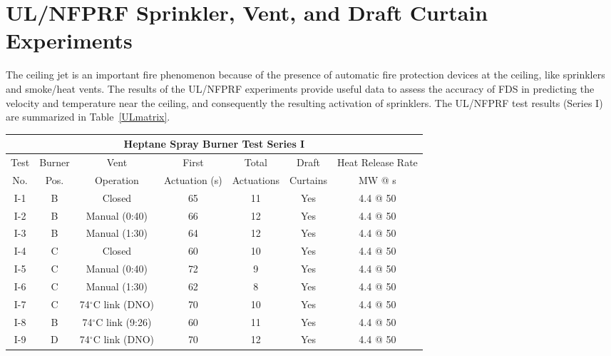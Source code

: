 \clearpage

\section{UL/NFPRF Sprinkler, Vent, and Draft Curtain Experiments}
\label{UL_NFPRF:Results}

The ceiling jet is an important fire phenomenon because of the presence of automatic fire protection devices at the ceiling, like
sprinklers and smoke/heat vents. The results of the UL/NFPRF experiments provide useful data to assess the accuracy of FDS in predicting
the velocity and temperature near the ceiling, and consequently the resulting activation of sprinklers.
The UL/NFPRF test results (Series I) are summarized in Table~\ref{ULmatrix}.

\begin{table}[h!]
\begin{center}
\begin{tabular}{|c||c|c|c|c|c|c|}
\hline
\multicolumn{7}{|c|}{\bf Heptane Spray Burner Test Series I}  \\ \hline \hline
Test & Burner & Vent                    & First         & Total      & Draft    & Heat Release Rate \\
No.  & Pos.   & Operation               & Actuation (s) & Actuations & Curtains & MW @ s \\
\hline \hline
I-1   & B  & Closed                     & 65            & 11        & Yes  & 4.4 @ 50  \\ \hline
I-2   & B  & Manual (0:40)              & 66            & 12        & Yes  & 4.4 @ 50  \\ \hline
I-3   & B  & Manual (1:30)              & 64            & 12        & Yes  & 4.4 @ 50  \\ \hline
I-4   & C  & Closed                     & 60            & 10        & Yes  & 4.4 @ 50  \\ \hline
I-5   & C  & Manual (0:40)              & 72            & 9         & Yes  & 4.4 @ 50  \\ \hline
I-6   & C  & Manual (1:30)              & 62            & 8         & Yes  & 4.4 @ 50  \\ \hline
I-7   & C  & 74$^\circ$C link (DNO)     & 70            & 10        & Yes  & 4.4 @ 50  \\ \hline
I-8   & B  & 74$^\circ$C link (9:26)    & 60            & 11        & Yes  & 4.4 @ 50  \\ \hline
I-9   & D  & 74$^\circ$C link (DNO)     & 70            & 12        & Yes  & 4.4 @ 50  \\ \hline

\end{tabular}
\end{center}
\end{table}
